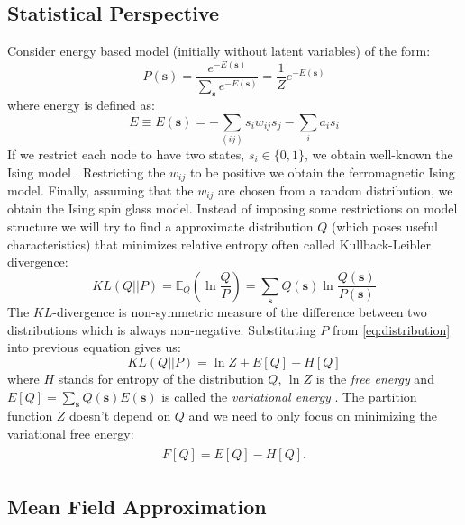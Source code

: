 \documentclass[../report/report.tex]{subfiles}
\begin{document}
\subsection{Statistical Perspective}
Consider energy based model (initially without latent variables) of the form:
\begin{equation}
P(\mathbf{s}) = \frac{ e^{-E(\mathbf{s})}}{\sum_{\mathbf{s}} e^{-E(\mathbf{s})}} = \frac{1}{Z}e^{-E(\mathbf{s})}
\label{eq:distribution}
\end{equation}
where energy is defined as:
$$E \equiv E (\mathbf{s}) = - \sum_{(ij)} s_i w_{ij} s_j - \sum_i a_i s_i $$
If we restrict each node to have two states, $s_i \in \{0,1 \}$, we obtain well-known the Ising model \cite{yedidia2001idiosyncratic}. Restricting the $w_{ij}$ to be positive we obtain the ferromagnetic Ising model. Finally, assuming that the $w_{ij}$ are chosen from a random distribution, we obtain the Ising spin glass model. Instead of imposing some restrictions on model structure we will try to find a approximate distribution $Q$ (which poses useful characteristics) that minimizes relative entropy often called Kullback-Leibler divergence:
\begin{equation}
KL(Q || P)  = \mathbb{E}_{Q}\left( \ln \frac{Q}{P} \right) = \sum_{\mathbf{s}} Q(\mathbf{s}) \ln \frac{Q(\mathbf{s})}{P(\mathbf{s})}  
\label{eq:kl}
\end{equation}
The $KL$-divergence is non-symmetric measure of the difference between two distributions which is always non-negative. Substituting $P$ from \ref{eq:distribution} into previous equation gives us:
$$ KL(Q||P) = \ln Z + E[Q] - H[Q]$$
where $H$ stands for entropy of the distribution $Q$, $\ln Z$ is the \emph{free energy} and $E[Q] = \sum_{\mathbf{s}} Q(\mathbf{s})E(\mathbf{s})$ is called the \emph{variational energy} \cite{opper2001advanced}. The partition function $Z$ doesn't depend on $Q$ and we need to only focus on minimizing the variational free energy:
\begin{align}
\begin{split}
F[Q] = E[Q] - H[Q].
\label{eq:gibbsFreeEnergy}
\end{split}
\end{align}



\subsection{Mean Field Approximation}
\end{document}
